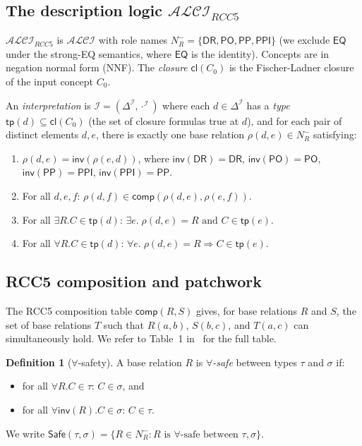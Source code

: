 \documentclass[a4paper,11pt]{article}
\theoremstyle{definition}
\newtheorem{definition}[theorem]{Definition}
\newcommand{\ALCI}{\ensuremath{\mathcal{ALCI}}}
\newcommand{\ALCIRCC}[1]{\ensuremath{\mathcal{ALCI}_{\mathit{RCC#1}}}}
\newcommand{\NR}{\ensuremath{N_R^{-}}}
\newcommand{\DeltaI}{\ensuremath{\Delta^{\mathcal{I}}}}
\newcommand{\interp}{\ensuremath{\mathcal{I}}}
\newcommand{\DR}{\ensuremath{\mathsf{DR}}}
\newcommand{\PO}{\ensuremath{\mathsf{PO}}}
\newcommand{\EQ}{\ensuremath{\mathsf{EQ}}}
\newcommand{\PP}{\ensuremath{\mathsf{PP}}}
\newcommand{\PPI}{\ensuremath{\mathsf{PPI}}}
\newcommand{\inv}{\ensuremath{\mathsf{inv}}}
\newcommand{\comp}{\ensuremath{\mathsf{comp}}}
\newcommand{\cl}{\ensuremath{\mathsf{cl}}}
\newcommand{\tp}{\ensuremath{\mathsf{tp}}}
\newcommand{\Safe}{\ensuremath{\mathsf{Safe}}}
\begin{document}
\subsection{The description logic $\ALCIRCC{5}$}

$\ALCIRCC{5}$ is $\ALCI$ with role names $\NR = \{\DR, \PO,
\PP, \PPI\}$ (we exclude $\EQ$ under the strong-EQ semantics,
where $\EQ$ is the identity).  Concepts are in negation normal
form (NNF).  The \emph{closure} $\cl(C_0)$ is the Fischer-Ladner
closure of the input concept $C_0$.

An \emph{interpretation} is $\interp = (\DeltaI, \cdot^\interp)$
where each $d \in \DeltaI$ has a \emph{type}
$\tp(d) \subseteq \cl(C_0)$ (the set of closure formulas true at $d$),
and for each pair of distinct elements $d, e$, there is exactly one
base relation $\rho(d, e) \in \NR$ satisfying:
\begin{enumerate}[nosep,label=(C\arabic*)]
  \item $\rho(d, e) = \inv(\rho(e, d))$, where
    $\inv(\DR) = \DR$, $\inv(\PO) = \PO$,
    $\inv(\PP) = \PPI$, $\inv(\PPI) = \PP$.
  \item For all $d, e, f$:
    $\rho(d, f) \in \comp(\rho(d, e), \rho(e, f))$.
  \item For all $\exists R.C \in \tp(d)$:
    $\exists e.\; \rho(d,e) = R \text{ and } C \in \tp(e)$.
  \item For all $\forall R.C \in \tp(d)$:
    $\forall e.\; \rho(d,e) = R \Rightarrow C \in \tp(e)$.
\end{enumerate}


\subsection{RCC5 composition and patchwork}

The RCC5 composition table $\comp(R, S)$ gives, for base
relations $R$ and $S$, the set of base relations $T$ such that
$R(a,b)$, $S(b,c)$, and $T(a,c)$ can simultaneously hold.  We
refer to Table~1 in~\cite{CompanionPaper} for the full table.

\begin{definition}[$\forall$-safety]
\label{def:safe}
A base relation $R$ is \emph{$\forall$-safe} between types
$\tau$ and $\sigma$ if:
\begin{itemize}[nosep]
  \item for all $\forall R.C \in \tau$: $C \in \sigma$, and
  \item for all $\forall \inv(R).C \in \sigma$: $C \in \tau$.
\end{itemize}
We write $\Safe(\tau, \sigma) = \{R \in \NR : R \text{ is $\forall$-safe between } \tau, \sigma\}$.
\end{definition}
\end{document}
